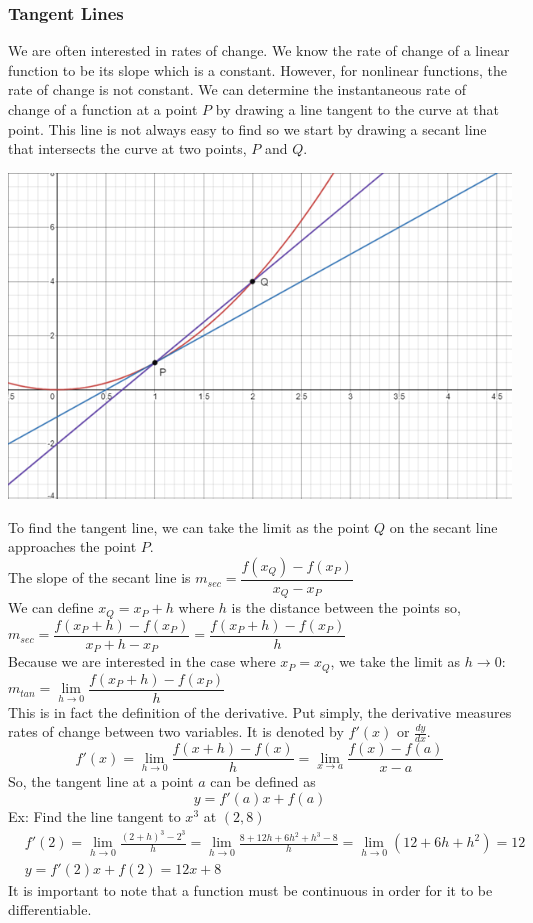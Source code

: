 \documentclass[11pt, fleqn]{article}
\begin{document}
\subsubsection{Tangent Lines}
We are often interested in rates of change. We know the rate of change of a linear function to be its slope which is a constant. However, for nonlinear functions, the rate of change is not constant. We can determine the instantaneous rate of change of a function at a point $P$ by drawing a line tangent to the curve at that point. This line is not always easy to find so we start by drawing a secant line that intersects the curve at two points, $P$ and $Q$.\\
\centerline{\includegraphics[scale =0.7]{DifferentialCalculusPictures/Tangent.png}}
To find the tangent line, we can take the limit as the point $Q$ on the secant line approaches the point $P$.\\
The slope of the secant line is $m_{sec}=\dfrac{f(x_Q)-f(x_P)}{x_Q-x_P}$\\
We can define $x_Q=x_P+h$ where $h$ is the distance between the points so,\\ ${m_{sec}=\dfrac{f(x_P+h)-f(x_P)}{x_P+h-x_P}=\dfrac{f(x_P+h)-f(x_P)}{h}}$\\
Because we are interested in the case where $x_P=x_Q$, we take the limit as $h\to 0$:\\
$m_{tan}=\displaystyle{\lim \limits_{h\to 0}\dfrac{f(x_P+h)-f(x_P)}{h}}$\\
This is in fact the definition of the derivative. Put simply, the derivative measures rates of change between two variables. It is denoted by $f'(x)$ or $\frac{dy}{dx}$.\\
$$f'(x)=\lim\limits_{h\to 0}\frac{f(x+h)-f(x)}{h}=\lim_{x\to a}\frac{f(x)-f(a)}{x-a}$$
So, the tangent line at a point $a$ can be defined as $$y=f'(a)x+f(a)$$
Ex: Find the line tangent to $x^3$ at $(2,8)$
\begin{align*}
    &f'(2)=\lim\limits_{h\to 0}\frac{(2+h)^3-2^3}{h}=\lim\limits_{h\to 0}\frac{8+12h+6h^2+h^3-8}{h}=\lim\limits_{h\to 0}(12+6h+h^2)=12\\
    &y=f'(2)x+f(2)=12x+8
\end{align*}
It is important to note that a function must be continuous in order for it to be differentiable.
\end{document}
